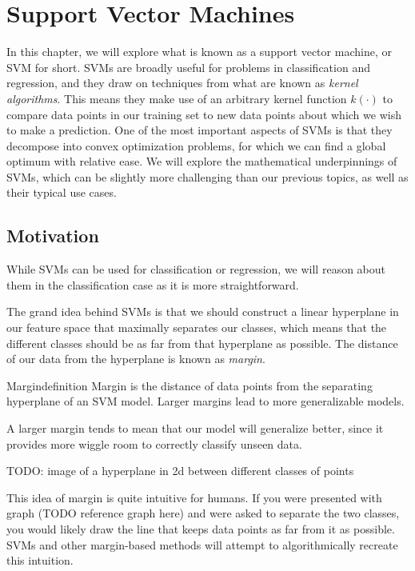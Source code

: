 \chapter{Support Vector Machines}
In this chapter, we will explore what is known as a support vector machine, or SVM for short. SVMs are broadly useful for problems in classification and regression, and they draw on techniques from what are known as \textit{kernel algorithms}. This means they make use of an arbitrary kernel function $k(\cdot)$ to compare data points in our training set to new data points about which we wish to make a prediction. One of the most important aspects of SVMs is that they decompose into convex optimization problems, for which we can find a global optimum with relative ease. We will explore the mathematical underpinnings of SVMs, which can be slightly more challenging than our previous topics, as well as their typical use cases.

\section{Motivation}
While SVMs can be used for classification or regression, we will reason about them in the classification case as it is more straightforward. 

The grand idea behind SVMs is that we should construct a linear hyperplane in our feature space that maximally separates our classes, which means that the different classes should be as far from that hyperplane as possible. The distance of our data from the hyperplane is known as \textit{margin}.

\begin{definition}{Margin}{definition}
Margin is the distance of data points from the separating hyperplane of an SVM model. Larger margins lead to more generalizable models.
\end{definition}

A larger margin tends to mean that our model will generalize better, since it provides more wiggle room to correctly classify unseen data.

TODO: image of a hyperplane in 2d between different classes of points

This idea of margin is quite intuitive for humans. If you were presented with graph (TODO reference graph here) and were asked to separate the two classes, you would likely draw the line that keeps data points as far from it as possible. SVMs and other margin-based methods will attempt to algorithmically recreate this intuition.

